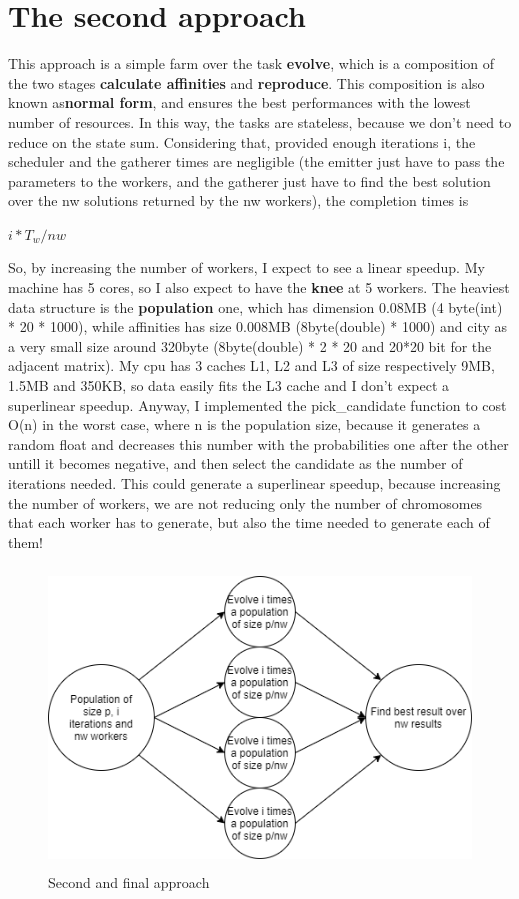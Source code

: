 \documentclass{article}
\begin{document}
    \section{The second approach}\label{sec:s3}
	This approach is a simple farm over the task \textbf{evolve}, which is a composition of the two stages \textbf{calculate affinities} and \textbf{reproduce}. This composition is also known as\textbf{normal form}, and ensures the best performances with the lowest number of resources. In this way, the tasks are stateless, because we don't need to reduce on the state sum.
Considering that, provided enough iterations i, the scheduler and the gatherer times are negligible (the emitter just have to pass the parameters to the workers, and the gatherer just have to find the best solution over the nw solutions returned by the nw workers), the completion times is

	\centerline{$i*T_{w}/nw$}

    So, by increasing the number of workers, I expect to see a linear speedup. My machine has 5 cores, so I also expect to have the \textbf{knee} at 5 workers. The heaviest data structure is the \textbf{population} one, which has dimension 0.08MB (4 byte(int) * 20 * 1000), while affinities has size 0.008MB (8byte(double) * 1000) and city as a very small size around 320byte (8byte(double) * 2 * 20 and 20*20 bit for the adjacent matrix). My cpu has 3 caches L1, L2 and L3 of size respectively 9MB, 1.5MB and 350KB, so data easily fits the L3 cache and I don't expect a superlinear speedup.
    Anyway, I implemented the pick\_candidate function to cost O(n) in the worst case, where n is the population size, because it generates a random float and decreases this number with the probabilities one after the other untill it becomes negative, and then select the candidate as the number of iterations needed. This could generate a superlinear speedup, because increasing the number of workers, we are not reducing only the number of chromosomes that each worker has to generate, but also the time needed to generate each of them!

    \begin{figure}
        \includegraphics[width=\linewidth, height=8cm]{img/second.png}
        \caption{Second and final approach}
        \label{fig:second}
    \end{figure}
\end{document}
